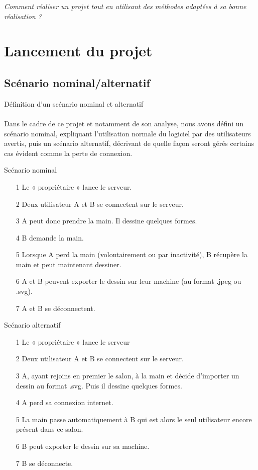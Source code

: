\documentclass[a4paper,11pt]{article}
\begin{document}
\textit{Comment réaliser un projet tout en utilisant des méthodes adaptées à sa bonne réalisation ?}


\section{Lancement du projet}
\subsection{Scénario nominal/alternatif}
Définition d'un scénario nominal et alternatif

\paragraph{} Dans le cadre de ce projet et notamment de son analyse, nous avons défini un scénario nominal, expliquant l'utilisation normale du logiciel par des utilisateurs avertis, puis un scénario alternatif, décrivant de quelle façon seront gérés certains cas évident comme la perte de connexion.

Scénario nominal

\begin{itemize}
	\item[1]Le « propriétaire » lance le serveur.
	\item[2]Deux utilisateur A et B se connectent sur le serveur.
	\item[3]A peut donc prendre la main. Il dessine quelques formes.
	\item[4]B demande la main.
	\item[5]Lorsque A perd la main (volontairement ou par inactivité), B récupère la main et peut maintenant dessiner.
	\item[6]A et B peuvent exporter le dessin sur leur machine (au format .jpeg ou .svg).
	\item[7]A et B se déconnectent.
\end{itemize}

Scénario alternatif

\begin{itemize}
	\item[1]Le « propriétaire » lance le serveur
	\item[2]Deux utilisateur A et B se connectent sur le serveur.
	\item[3]A, ayant rejoins en premier le salon, à la main et décide d'importer un dessin au format .svg. Puis il dessine quelques formes.
	\item[4]A perd sa connexion internet.
	\item[5]La main passe automatiquement à B qui est alors le seul utilisateur encore présent dans ce salon.
	\item[6]B peut exporter le dessin sur sa machine.
	\item[7]B se déconnecte.
\end{itemize}
\end{document}
